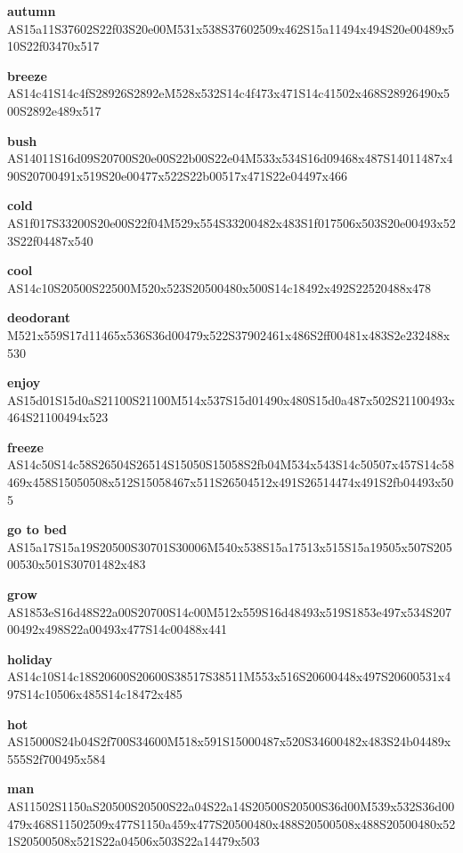 \documentclass{article}
\begin{document}
\begin{glossary}

\textbf{autumn}\\
AS15a11S37602S22f03S20e00M531x538S37602509x462S15a11494x494S20e00489x510S22f03470x517

\textbf{breeze}\\
AS14c41S14c4fS28926S2892eM528x532S14c4f473x471S14c41502x468S28926490x500S2892e489x517

\textbf{bush}\\
AS14011S16d09S20700S20e00S22b00S22e04M533x534S16d09468x487S14011487x490S20700491x519S20e00477x522S22b00517x471S22e04497x466

\textbf{cold}\\
AS1f017S33200S20e00S22f04M529x554S33200482x483S1f017506x503S20e00493x523S22f04487x540

\textbf{cool}\\
AS14c10S20500S22500M520x523S20500480x500S14c18492x492S22520488x478

\textbf{deodorant}\\
M521x559S17d11465x536S36d00479x522S37902461x486S2ff00481x483S2e232488x530

\textbf{enjoy}\\
AS15d01S15d0aS21100S21100M514x537S15d01490x480S15d0a487x502S21100493x464S21100494x523

\textbf{freeze}\\
AS14c50S14c58S26504S26514S15050S15058S2fb04M534x543S14c50507x457S14c58469x458S15050508x512S15058467x511S26504512x491S26514474x491S2fb04493x505

\textbf{go to bed}\\
AS15a17S15a19S20500S30701S30006M540x538S15a17513x515S15a19505x507S20500530x501S30701482x483

\textbf{grow}\\
AS1853eS16d48S22a00S20700S14c00M512x559S16d48493x519S1853e497x534S20700492x498S22a00493x477S14c00488x441

\textbf{holiday}\\
AS14c10S14c18S20600S20600S38517S38511M553x516S20600448x497S20600531x497S14c10506x485S14c18472x485

\textbf{hot}\\
AS15000S24b04S2f700S34600M518x591S15000487x520S34600482x483S24b04489x555S2f700495x584

\textbf{man}\\
AS11502S1150aS20500S20500S22a04S22a14S20500S20500S36d00M539x532S36d00479x468S11502509x477S1150a459x477S20500480x488S20500508x488S20500480x521S20500508x521S22a04506x503S22a14479x503


\end{glossary}
\end{document}
